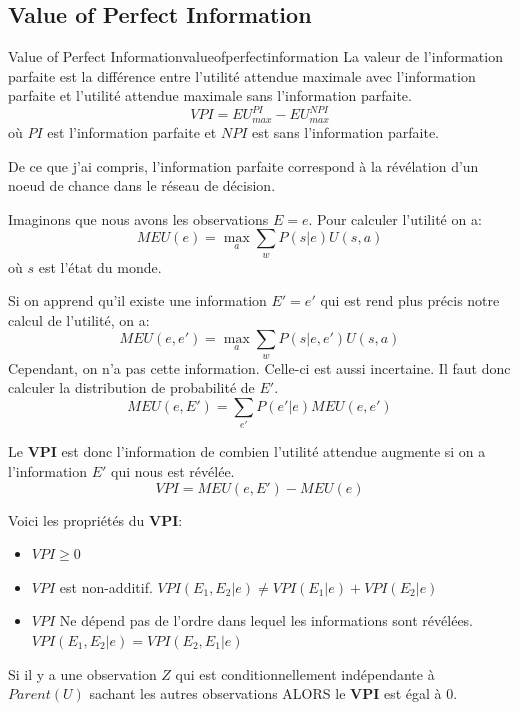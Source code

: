 \subsection{Value of Perfect Information} %
\label{sub:value_of_perfect_information}

\begin{definition}{Value of Perfect Information}{valueofperfectinformation}
    La valeur de l'information parfaite est la différence entre l'utilité attendue maximale avec l'information parfaite et l'utilité attendue maximale sans l'information parfaite.
    \begin{equation}
        VPI = EU_{max}^{PI} - EU_{max}^{NPI}
    \end{equation} 
    où $PI$ est l'information parfaite et $NPI$ est sans l'information parfaite.
\end{definition} 

\begin{remark}\leavevmode
    De ce que j'ai compris, l'information parfaite correspond à la révélation d'un noeud de chance dans le réseau de décision.
\end{remark}

Imaginons que nous avons les observations $E = e$. Pour calculer l'utilité on a: 
\begin{equation*}
    MEU(e) = \max_{a} \sum_{w} P(s | e) U(s, a)
\end{equation*}
où $s$ est l'état du monde.

Si on apprend qu'il existe une information $E'=e'$ qui est rend plus précis notre calcul de l'utilité, on a: 
\begin{equation*}
    MEU(e, e') = \max_{a} \sum_{w} P(s | e, e') U(s, a) 
\end{equation*}
Cependant, on n'a pas cette information. Celle-ci est aussi incertaine. Il faut donc calculer la distribution de probabilité de $E'$. 
\begin{equation*}
    MEU(e, E') = \sum_{e'} P(e'|e) MEU(e, e')
\end{equation*}

Le \textbf{VPI} est donc l'information de combien l'utilité attendue augmente si on a l'information $E'$ qui nous est révélée.
\begin{equation*}
    VPI = MEU(e, E') - MEU(e)
\end{equation*}


Voici les propriétés du \textbf{VPI}: 
\begin{itemize}[label=\textbullet]
    \item $VPI \geq 0$ 
    \item $VPI$ est non-additif. $VPI(E_1, E_2| e) \neq VPI(E_1| e) + VPI(E_2| e)$
    \item $VPI$ Ne dépend pas de l'ordre dans lequel les informations sont révélées. $VPI(E_1, E_2| e) = VPI(E_2, E_1| e)$

\end{itemize}

Si il y a une observation $Z$ qui est conditionnellement indépendante à $Parent(U)$ sachant les autres observations ALORS 
le \textbf{VPI} est égal à $0$.





